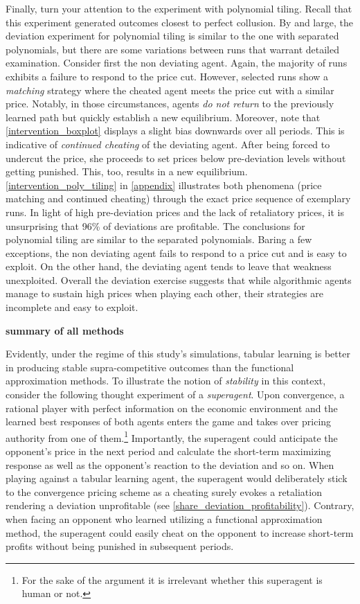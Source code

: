 Finally, turn your attention to the experiment with polynomial tiling. Recall that this experiment generated outcomes closest to perfect collusion. By and large, the deviation experiment for polynomial tiling is similar to the one with separated polynomials, but there are some variations between runs that warrant detailed examination. Consider first the non deviating agent. Again, the majority of runs exhibits a failure to respond to the price cut. However, selected runs show a \emph{matching} strategy where the cheated agent meets the price cut with a similar price. Notably, in those circumstances, agents \emph{do not return} to the previously learned path but quickly establish a new equilibrium. Moreover, note that \autoref{intervention_boxplot} displays a slight bias downwards over all periods. This is indicative of \emph{continued cheating} of the deviating agent. After being forced to undercut the price, she proceeds to set prices below pre-deviation levels without getting punished. This, too, results in a new equilibrium. \autoref{intervention_poly_tiling} in \autoref{appendix} illustrates both phenomena (price matching and continued cheating) through the exact price sequence of exemplary runs. In light of high pre-deviation prices and the lack of retaliatory prices, it is unsurprising that 96\% of deviations are profitable. The conclusions for polynomial tiling are similar to the separated polynomials. Baring a few exceptions, the non deviating agent fails to respond to a price cut and is easy to exploit. On the other hand, the deviating agent tends to leave that weakness unexploited.
Overall the deviation exercise suggests that while algorithmic agents manage to sustain high prices when playing each other, their strategies are incomplete and easy to exploit.

\textbf{summary of all methods}

Evidently, under the regime of this study's simulations, tabular learning is better in producing stable supra-competitive outcomes than the functional approximation methods. To illustrate the notion of \emph{stability} in this context, consider the following thought experiment of a \emph{superagent}. Upon convergence, a rational player with perfect information on the economic environment and the learned best responses of both agents enters the game and takes over pricing authority from one of them.\footnote{For the sake of the argument it is irrelevant whether this superagent is human or not.} Importantly, the superagent could anticipate the opponent's price in the next period and calculate the short-term maximizing response as well as the opponent's reaction to the deviation and so on. When playing against a tabular learning agent, the superagent would deliberately stick to the convergence pricing scheme as a cheating surely evokes a retaliation rendering a deviation unprofitable (see \autoref{share_deviation_profitability}). Contrary, when facing an opponent who learned utilizing a functional approximation method, the superagent could easily cheat on the opponent to increase short-term profits without being punished in subsequent periods.


